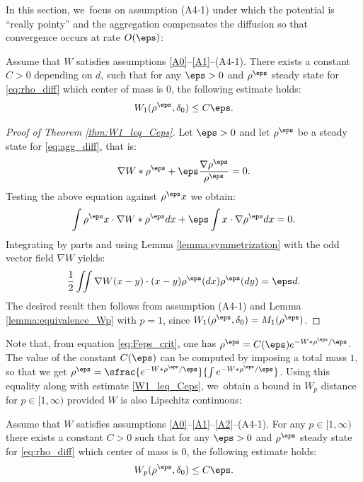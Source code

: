 
In this section, we~focus on assumption (A4-1) under which the potential is ``really pointy'' and the aggregation compensates the diffusion so that convergence occurs at rate $O(\eps)$:
\begin{theorem}\label{thm:W1_leq_Ceps}
Assume that $W$ satisfies assumptions \eqref{A0}--\eqref{A1}--\textup{(A4-1)}. There exists a constant $C > 0$ depending on $d$, such that for any $\eps>0$ and $\rho^\eps$ steady state for \eqref{eq:rho_diff} which center of mass is $0$, the following estimate holds:
\begin{equation}\label{W1_leq_Ceps}
W_1(\rho^\eps, \delta_0) \leq C\eps.
\end{equation}
\end{theorem}
\begin{proof}[Proof of Theorem \ref{thm:W1_leq_Ceps}]
Let $\eps>0$ and let $\rho^\eps$ be a steady state for \eqref{eq:agg_diff}, that is:
\begin{equation}\label{eq:Feps_crit}
\nabla W * \rho^\eps + \eps \frac{\nabla \rho^\eps}{\rho^\eps} = 0.
\end{equation}
Testing the above equation against $\rho^\eps x$ we obtain:
\[
\int \rho^\eps x \cdot \nabla W * \rho^\eps dx + \eps \int x \cdot \nabla \rho^\eps dx = 0.
\]
Integrating by parts and using Lemma \ref{lemma:symmetrization} with the odd vector field $\nabla W$ yields:
\[
\frac{1}{2} \iint \nabla W(x-y) \cdot (x-y) \rho^\eps(dx) \rho^\eps(dy) = \eps d.
\]
The desired result then follows from assumption (A4-1) and Lemma \ref{lemma:equivalence_Wp} with $p=1$, since $W_1(\rho^\eps, \delta_0) = M_1(\rho^\eps)$.
\end{proof}
Note that, from equation \eqref{eq:Feps_crit}, one has $\rho^\eps =C(\eps)e^{-W * \rho^\eps / \eps}$. The value of the constant $C(\eps)$ can be computed by imposing a total mass $1$, so that we get $\rho^\eps=\sfrac{e^{-W * \rho^\eps / \eps}}{\int e^{-W * \rho^\eps / \eps}}$. Using this equality along with estimate \eqref{W1_leq_Ceps}, we~obtain a bound in $W_p$ distance for $p \in [1, \infty)$ provided $W$ is also Lipschitz continuous:
\begin{theorem}
Assume that $W$ satisfies assumptions \eqref{A0}--\eqref{A1}--\eqref{A2}--\textup{(A4-1)}. For any $p \in [1, \infty)$ there exists a constant $C > 0$ such that for any $\eps>0$ and $\rho^\eps$ steady state for \eqref{eq:rho_diff} which center of mass is 0, the following estimate holds:
\begin{equation*}%
W_p(\rho^\eps, \delta_0) \leq C\eps.
\end{equation*}
\end{theorem}
